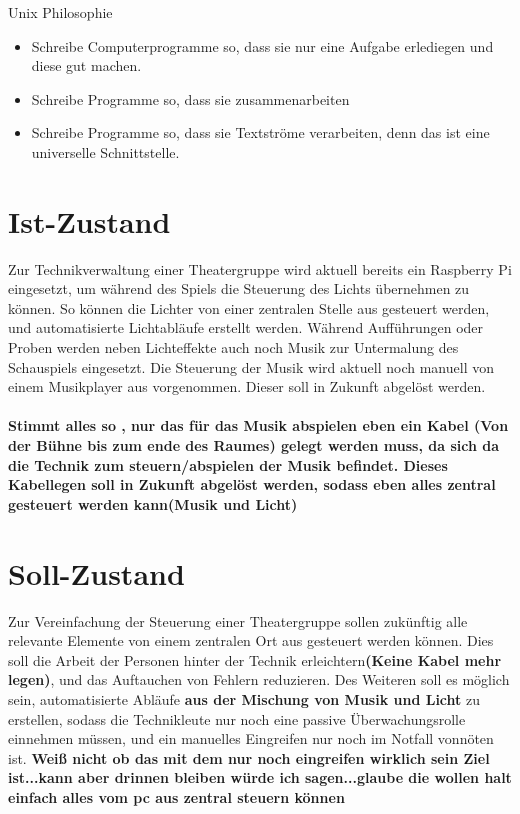 Unix Philosophie
\begin{itemize}
\item Schreibe Computerprogramme so, dass sie nur eine Aufgabe erlediegen und
diese gut machen.
\item Schreibe Programme so, dass sie zusammenarbeiten
\item Schreibe Programme so, dass sie Textströme verarbeiten, denn das ist eine
universelle Schnittstelle.
\end{itemize}


\section{Ist-Zustand}
Zur Technikverwaltung einer Theatergruppe wird aktuell bereits ein Raspberry
Pi eingesetzt, um während des Spiels die Steuerung des Lichts übernehmen zu
können. So können die Lichter von einer zentralen Stelle aus gesteuert werden,
und automatisierte Lichtabläufe erstellt werden. Während Aufführungen oder
Proben werden neben Lichteffekte auch noch Musik zur Untermalung des
Schauspiels eingesetzt. Die Steuerung der Musik wird aktuell noch manuell von
einem Musikplayer aus vorgenommen. Dieser soll in Zukunft abgelöst werden. \\
\\
\textbf{ Stimmt alles so , nur das für das Musik abspielen eben ein Kabel (Von der Bühne bis zum ende des Raumes) gelegt werden muss, da sich da die Technik zum steuern/abspielen der Musik befindet. Dieses Kabellegen soll in Zukunft abgelöst werden, sodass eben alles zentral gesteuert werden kann(Musik und Licht)}

\section{Soll-Zustand}
Zur Vereinfachung der Steuerung einer Theatergruppe sollen zukünftig alle
relevante Elemente von einem zentralen Ort aus gesteuert werden können. Dies
soll die Arbeit der Personen hinter der Technik erleichtern\textbf{(Keine Kabel mehr legen)}, und das Auftauchen
von Fehlern reduzieren. Des Weiteren soll es möglich sein, automatisierte
Abläufe \textbf{aus der Mischung von Musik und Licht} zu erstellen, sodass die Technikleute nur noch eine passive
Überwachungsrolle einnehmen müssen, und ein manuelles Eingreifen nur noch im
Notfall vonnöten ist. \textbf{Weiß nicht ob das mit dem nur noch eingreifen wirklich sein Ziel ist...kann aber drinnen bleiben würde ich sagen...glaube die wollen halt einfach alles vom pc aus zentral steuern können}

